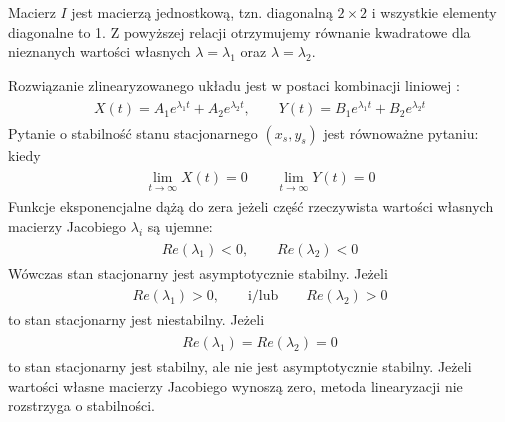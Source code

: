 \documentclass[a4paper,12pt,polish]{sphinxmanual}
\begin{document}
Macierz $I$ jest macierzą jednostkową, tzn. diagonalną $2\times 2$ i wszystkie elementy diagonalne to 1. Z powyższej relacji  otrzymujemy równanie kwadratowe dla nieznanych wartości  własnych $\lambda = \lambda_1$  oraz $\lambda = \lambda_2$.

Rozwiązanie zlinearyzowanego układu jest w postaci kombinacji liniowej :
\label{ch1/chI023:equation-eqn41}\begin{gather}
\begin{split}X(t) = A_1  e^{\lambda_1 t} + A_2 e^{\lambda_2 t}, \qquad  Y(t) = B_1 e^{\lambda_1 t} +  B_2 e^{\lambda_2 t}\end{split}\label{ch1/chI023-eqn41}
\end{gather}
Pytanie o stabilność stanu stacjonarnego $(x_s, y_s)$ jest równoważne pytaniu: kiedy
\label{ch1/chI023:equation-eqn42}\begin{gather}
\begin{split}\lim_{t\to \infty} X(t) = 0  \qquad \lim_{t\to \infty} Y(t) = 0\end{split}\label{ch1/chI023-eqn42}
\end{gather}
Funkcje eksponencjalne dążą do zera jeżeli część rzeczywista  wartości własnych macierzy Jacobiego $\lambda_i$ są  ujemne:
\label{ch1/chI023:equation-eqn43}\begin{gather}
\begin{split} Re(\lambda_1) < 0, \qquad Re(\lambda_2) < 0\end{split}\label{ch1/chI023-eqn43}
\end{gather}
Wówczas stan stacjonarny jest asymptotycznie stabilny. Jeżeli
\label{ch1/chI023:equation-eqn44}\begin{gather}
\begin{split} Re(\lambda_1) > 0, \qquad \mbox{i/lub} \qquad Re(\lambda_2) >  0\end{split}\label{ch1/chI023-eqn44}
\end{gather}
to stan stacjonarny jest niestabilny. Jeżeli
\label{ch1/chI023:equation-eqn45}\begin{gather}
\begin{split} Re(\lambda_1) = Re(\lambda_2) =  0\end{split}\label{ch1/chI023-eqn45}
\end{gather}
to stan stacjonarny jest stabilny, ale nie  jest asymptotycznie stabilny. Jeżeli wartości własne macierzy Jacobiego wynoszą zero, metoda linearyzacji nie rozstrzyga o stabilności.
\end{document}
